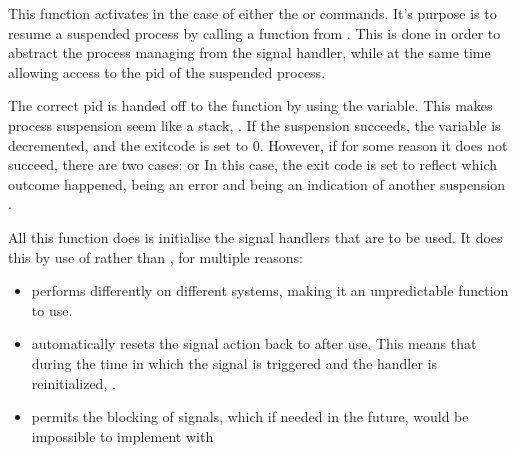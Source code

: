\documentclass[12pt, a4paper]{report}
\begin{document}
                \clearpage
                This function activates in the case of either the  or
                 commands. It's purpose is to resume a suspended process
                by calling a function from . This is done 
                in order to abstract the process managing  from the signal handler, while at the same time allowing
                access to the pid of the suspended process.

                The correct pid is handed off to the function by using the 
                 variable. This makes process suspension seem
                like a stack, . If the suspension
                succeeds, the  variable is decremented, and the
                exitcode is set to 0. However, if for some reason it does not succeed,
                there are two cases:  or  In this case, the exit code is set to reflect which
                outcome happened,  being an error and  being an indication
                of another suspension .
            
                All this function does is initialise the signal handlers that are to be
                used. It does this by use of  rather than ,
                for multiple reasons:
                    \begin{itemize}
                        \item {} performs differently on different systems,
                            making it an unpredictable function to use.
                        \item {} automatically resets the signal action back
                            to  after use. This means that during the time
                            in which the signal is triggered and the handler is 
                            reinitialized, .
                        \item {} permits the blocking of signals, which if needed
                            in the future, would be impossible to implement with 
                    \end{itemize}
                
\end{document}
